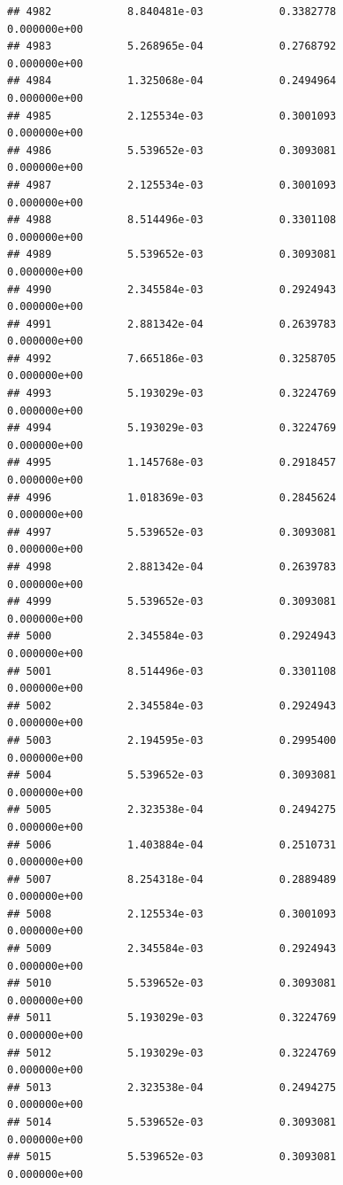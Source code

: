\documentclass[
]{article}
\begin{document}
\begin{verbatim}
## 4982            8.840481e-03            0.3382778            0.000000e+00
## 4983            5.268965e-04            0.2768792            0.000000e+00
## 4984            1.325068e-04            0.2494964            0.000000e+00
## 4985            2.125534e-03            0.3001093            0.000000e+00
## 4986            5.539652e-03            0.3093081            0.000000e+00
## 4987            2.125534e-03            0.3001093            0.000000e+00
## 4988            8.514496e-03            0.3301108            0.000000e+00
## 4989            5.539652e-03            0.3093081            0.000000e+00
## 4990            2.345584e-03            0.2924943            0.000000e+00
## 4991            2.881342e-04            0.2639783            0.000000e+00
## 4992            7.665186e-03            0.3258705            0.000000e+00
## 4993            5.193029e-03            0.3224769            0.000000e+00
## 4994            5.193029e-03            0.3224769            0.000000e+00
## 4995            1.145768e-03            0.2918457            0.000000e+00
## 4996            1.018369e-03            0.2845624            0.000000e+00
## 4997            5.539652e-03            0.3093081            0.000000e+00
## 4998            2.881342e-04            0.2639783            0.000000e+00
## 4999            5.539652e-03            0.3093081            0.000000e+00
## 5000            2.345584e-03            0.2924943            0.000000e+00
## 5001            8.514496e-03            0.3301108            0.000000e+00
## 5002            2.345584e-03            0.2924943            0.000000e+00
## 5003            2.194595e-03            0.2995400            0.000000e+00
## 5004            5.539652e-03            0.3093081            0.000000e+00
## 5005            2.323538e-04            0.2494275            0.000000e+00
## 5006            1.403884e-04            0.2510731            0.000000e+00
## 5007            8.254318e-04            0.2889489            0.000000e+00
## 5008            2.125534e-03            0.3001093            0.000000e+00
## 5009            2.345584e-03            0.2924943            0.000000e+00
## 5010            5.539652e-03            0.3093081            0.000000e+00
## 5011            5.193029e-03            0.3224769            0.000000e+00
## 5012            5.193029e-03            0.3224769            0.000000e+00
## 5013            2.323538e-04            0.2494275            0.000000e+00
## 5014            5.539652e-03            0.3093081            0.000000e+00
## 5015            5.539652e-03            0.3093081            0.000000e+00

\end{verbatim}
\end{document}
